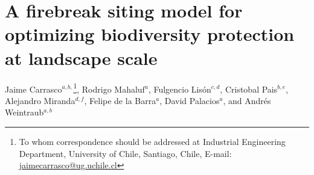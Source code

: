 \documentclass[10pt]{article}
\newcommand{\beginsupplement}{
    \setcounter{section}{0}
    \renewcommand{\thesection}{S\arabic{section}}
    \setcounter{equation}{0}
    \renewcommand{\theequation}{S\arabic{equation}}
    \setcounter{table}{0}
    \renewcommand{\thetable}{S\arabic{table}}
    \setcounter{figure}{0}
    \renewcommand{\thefigure}{S\arabic{figure}}
    \newcounter{SIfig}
    \renewcommand{\theSIfig}{S\arabic{SIfig}}}
\begin{document}

\beginsupplement
\noindent
\noindent
\section*{A firebreak siting model for optimizing biodiversity protection at landscape scale}

Jaime Carrasco$^{a,b,}$\footnote{To whom correspondence should be addressed at Industrial Engineering Department, University of Chile, Santiago, Chile, E-mail: \url{jaimecarrasco@ug.uchile.cl}}, Rodrigo Mahaluf$^{a}$, Fulgencio Lisón$^{c,d}$, Cristobal Pais$^{b,e}$, Alejandro Miranda$^{d,f}$, Felipe de la Barra$^{a}$, David Palacios$^{a}$, and Andr\'es Weintraub$^{a,b}$ \\
\end{document}

